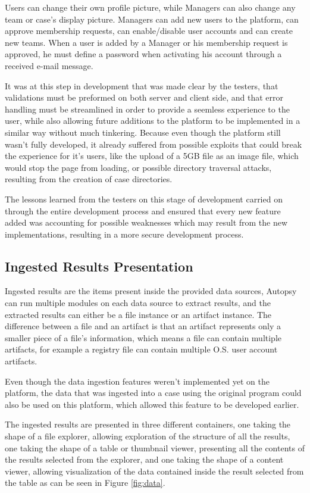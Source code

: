 Users can change their own profile picture, while Managers can also change any team or case's display picture.
Managers can add new users to the platform, can approve membership requests, can enable/disable user accounts and can create new teams.
When a user is added by a Manager or his membership request is approved, he must define a password when activating his account through a received e-mail message.

It was at this step in development that was made clear by the testers, that validations must be preformed on both server and client side, and that error handling must be streamlined
in order to provide a seemless experience to the user, while also allowing future additions to the platform to be implemented in a similar way without much tinkering. Because even though 
the platform still wasn't fully developed, it already suffered from possible exploits that could break the experience for it's users, like the upload of a 5GB file as an image file, which would stop the page from loading, 
or possible directory traversal attacks, resulting from the creation of case directories.

The lessons learned from the testers on this stage of development carried on through the entire development process and ensured that every new feature added was accounting for possible weaknesses which may result from the new 
implementations, resulting in a more secure development process.

\subsection{Ingested Results Presentation}

Ingested results are the items present inside the provided data sources, Autopsy can run multiple modules on each data source to extract results, and the extracted results can either be a file instance or an artifact instance.
The difference between a file and an artifact is that an artifact represents only a smaller piece of a file's information, which means a file can contain multiple artifacts, for example a registry file can contain multiple O.S. user account artifacts.

Even though the data ingestion features weren't implemented yet on the platform, the data that was ingested into a case using the original program could also be used on this platform, which allowed this feature to be developed earlier.

The ingested results are presented in three different containers, one taking the shape of a file explorer, allowing exploration of the structure of all the results, 
one taking the shape of a table or thumbnail viewer, presenting all the contents of the results selected from the explorer, and one taking the shape of a content viewer, allowing visualization
of the data contained inside the result selected from the table as can be seen in Figure \ref{fig:data}.

